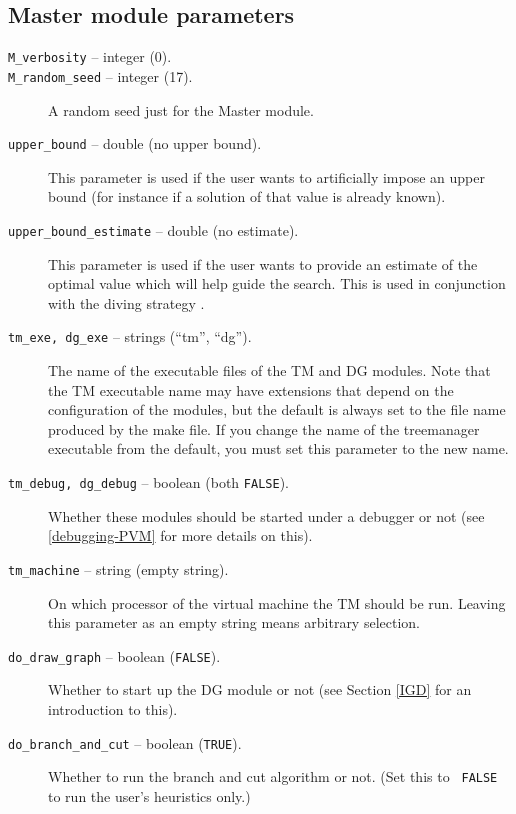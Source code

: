 \subsection{Master module parameters}
\begin{description}

\item[{\tt M\_verbosity} -- integer (0).]

\item[{\tt M\_random\_seed} -- integer (17).]
A random seed just for the Master module.

\item[{\tt upper\_bound} -- double (no upper bound).]
This parameter is used if the user wants to artificially impose an
upper bound (for instance if a solution of that value is already
known).

\label{upper_bound_estimate}
\item[{\tt upper\_bound\_estimate} -- double (no estimate).]
This parameter is used if the user wants to provide an estimate of the
optimal value which will help guide the search. This is used in
conjunction with the diving strategy .

\item[{\tt tm\_exe, dg\_exe} -- strings (``tm'', ``dg'').]
The name of the executable files of the TM and DG modules. Note that
the TM executable name may have extensions that depend on the
configuration of the modules, but the default is always set to the
file name produced by the make file. If you change the name of the
treemanager executable from the default, you must set this parameter
to the new name.

\item[{\tt tm\_debug, dg\_debug} -- boolean (both {\tt FALSE}).]
Whether these modules should be started under a debugger or not (see
\ref{debugging-PVM} for more details on this).

\item[{\tt tm\_machine} -- string (empty string).]
On which processor of the virtual machine the TM should be run. Leaving this
parameter as an empty string means arbitrary selection.

\item[{\tt do\_draw\_graph} -- boolean ({\tt FALSE}).]
Whether to start up the DG module or not (see Section \ref{IGD} for
an introduction to this).

\item[{\tt do\_branch\_and\_cut} -- boolean ({\tt TRUE}).]
Whether to run the branch and cut algorithm or not. (Set this to {\tt
FALSE} to run the user's heuristics only.)

\end{description}

